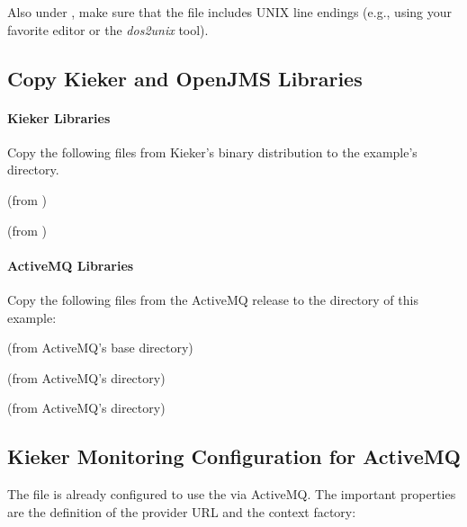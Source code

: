 \noindent Also under \UnixLikeSystems{}, make sure that the file  %
includes UNIX line endings (e.g., using your favorite editor or the \textit{dos2unix} tool).

\subsection{Copy Kieker and OpenJMS Libraries}

\paragraph*{Kieker Libraries}

Copy the following files from Kieker's binary distribution to %
the example's  directory.

\medskip

\begin{compactenum}
 \item \file{\mainJarEMF} (from )
 \item \file{\commonsLoggingJar} (from )
\end{compactenum}

\paragraph*{ActiveMQ Libraries}

Copy the following files from the ActiveMQ release to the %
 directory of this example:

\medskip

\begin{compactenum}
\item {} (from ActiveMQ's base directory)
\item {} (from ActiveMQ's  directory)
\item {} (from ActiveMQ's  directory)
\end{compactenum}

\subsection{Kieker Monitoring Configuration for ActiveMQ}

The file  %
is already configured to use the  via ActiveMQ. The important properties are %
the definition of the provider URL and the context factory:

